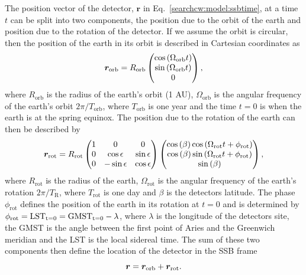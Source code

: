 The position vector of the detector,
$\bm{r}$ in Eq.~\ref{searchcw:model:ssbtime}, at a time $t$ can be split into two components,
the position due to the orbit of the earth and position due to the rotation of
the detector.
If we assume the orbit is circular, then the position of the earth in its orbit
is described in Cartesian coordinates as
%
\begin{equation}
    \bm{r}_{\rm{orb}} = R_{\mathrm{orb}}
    \left(
    \begin{matrix}
        \cos{\left( \Omega_{\mathrm{orb}} t   \right)}  \\
        \sin{\left( \Omega_{\mathrm{orb}} t   \right)} \\
        0 \\
    \end{matrix} \right),
\end{equation}
%
where $R_{\mathrm{orb}}$ is the radius of the earth's orbit (1 AU),
$\Omega_{\mathrm{orb}}$ is the angular frequency of the earth's orbit
$2\pi/T_{\mathrm{orb}}$, where $T_{\mathrm{orb}}$ is one year and the time $t=0$ is when the earth is at the spring equinox.  The
position due to the rotation of the earth can then be described by 
%
\begin{equation}
    \bm{r}_{\rm{rot}} = R_{\mathrm{rot}}
    \left(
    \begin{matrix}
        1 & 0 & 0  \\
        0 & \cos \epsilon & \sin \epsilon \\
        0 & -\sin \epsilon & \cos \epsilon \\
    \end{matrix} \right)
    \left(
    \begin{matrix}
        \cos{(\beta)}\cos{\left( \Omega_{\mathrm{rot}} t + \phi_{\mathrm{rot}}  \right)}  \\
        \cos{(\beta)}\sin{\left( \Omega_{\mathrm{rot}} t + \phi_{\mathrm{rot}}  \right)} \\
        \sin{(\beta)} \\
    \end{matrix} \right),
\end{equation}
%
where $R_{\mathrm{rot}}$ is the radius of the earth, $\Omega_{\mathrm{rot}}$ is the
angular frequency of the earth's rotation $2\pi/T_{\mathrm{R}}$, where
$T_{\mathrm{rot}}$ is one day and $\beta$ is the detectors latitude. The phase $\phi_{\mathrm{rot}}$ defines the position of the earth in its rotation at $t=0$ and is determined by $\phi_{\mathrm{rot}} = \rm{LST}_{t=0} = \rm{GMST}_{t=0} - \lambda$, where $\lambda$  is the longitude of
the detectors site, the \gls{GMST} is the angle between the first point of Aries and the Greenwich meridian and the LST is the local sidereal time. The sum of these two components
then define the location of the detector in the \gls{SSB} frame
%
\begin{equation}
    \bm{r} = \bm{r}_{\rm{orb}} + \bm{r}_{\rm{rot}}.
\end{equation}

